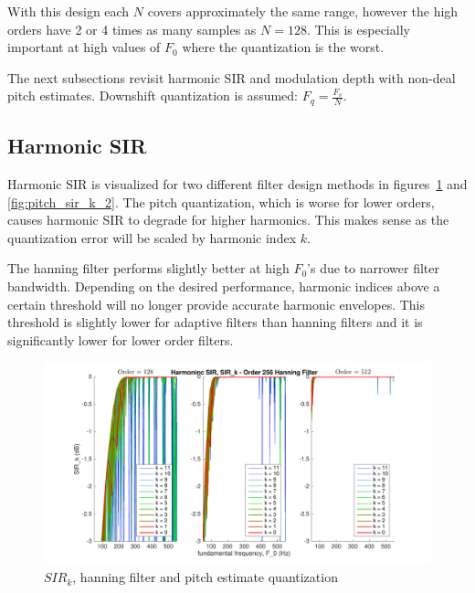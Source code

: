 \documentclass [11pt, proquest,oneside] {ganter_thesis}[2015/03/03]
\begin{document}
With this design each $N$ covers approximately the same range, however the high orders have 2 or 4 times as many samples as $N = 128$.  This is especially important at high values of $F_0$ where the quantization is the worst.

The next subsections revisit harmonic SIR and modulation depth with non-deal pitch estimates.  Downshift quantization is assumed: $F_q = \frac{F_s}{N}$.

\subsection{Harmonic SIR}

Harmonic SIR is visualized for two different filter design methods in figures~\ref{fig:pitch_sir_k_1} and \ref{fig:pitch_sir_k_2}.  The pitch quantization, which is worse for lower orders, causes harmonic SIR to degrade for higher harmonics.  This makes sense as the quantization error will be scaled by harmonic index $k$.

The hanning filter performs slightly better at high $F_0$'s due to narrower filter bandwidth.  Depending on the desired performance, harmonic indices above a certain threshold will no longer provide accurate harmonic envelopes.  This threshold is slightly lower for adaptive filters than hanning filters and it is significantly lower for lower order filters.

\begin{figure}[!ht]
  \centering
    \includegraphics[width=1\textwidth]{pitch_sir_k_1}
    \caption{$SIR_k$, hanning filter and pitch estimate quantization}\label{fig:pitch_sir_k_1}
\end{figure}
\end{document}
